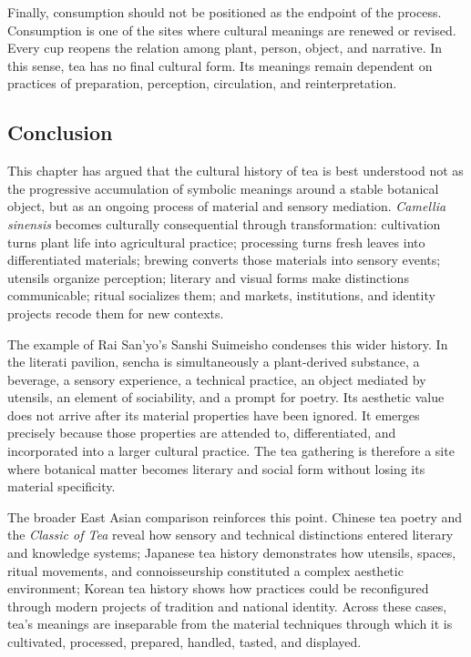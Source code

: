 \documentclass[numbers]{IntechOpen-Book}
\begin{document}
Finally, consumption should not be positioned as the endpoint of the process. Consumption is one of the sites where cultural meanings are renewed or revised. Every cup reopens the relation among plant, person, object, and narrative. In this sense, tea has no final cultural form. Its meanings remain dependent on practices of preparation, perception, circulation, and reinterpretation.

\begin{backmatter}
\section{Conclusion}

This chapter has argued that the cultural history of tea is best understood not as the progressive accumulation of symbolic meanings around a stable botanical object, but as an ongoing process of material and sensory mediation. \textit{Camellia sinensis} becomes culturally consequential through transformation: cultivation turns plant life into agricultural practice; processing turns fresh leaves into differentiated materials; brewing converts those materials into sensory events; utensils organize perception; literary and visual forms make distinctions communicable; ritual socializes them; and markets, institutions, and identity projects recode them for new contexts.

The example of Rai San'yo's Sanshi Suimeisho condenses this wider history. In the literati pavilion, sencha is simultaneously a plant-derived substance, a beverage, a sensory experience, a technical practice, an object mediated by utensils, an element of sociability, and a prompt for poetry. Its aesthetic value does not arrive after its material properties have been ignored. It emerges precisely because those properties are attended to, differentiated, and incorporated into a larger cultural practice. The tea gathering is therefore a site where botanical matter becomes literary and social form without losing its material specificity.

The broader East Asian comparison reinforces this point. Chinese tea poetry and the \textit{Classic of Tea} reveal how sensory and technical distinctions entered literary and knowledge systems; Japanese tea history demonstrates how utensils, spaces, ritual movements, and connoisseurship constituted a complex aesthetic environment; Korean tea history shows how practices could be reconfigured through modern projects of tradition and national identity. Across these cases, tea's meanings are inseparable from the material techniques through which it is cultivated, processed, prepared, handled, tasted, and displayed.


\end{backmatter}
\end{document}
